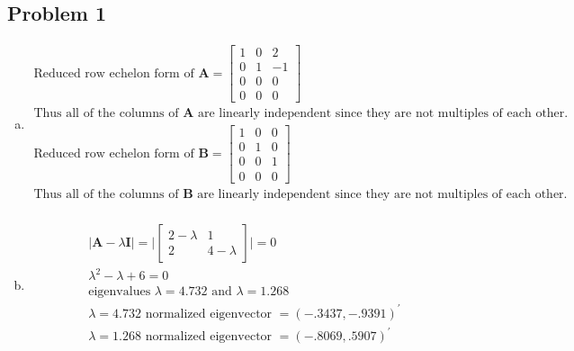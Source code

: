 \documentclass{article}
\begin{document}
\begin{flushleft}

	\section*{Problem 1}
\begin{enumerate}[(a)]
	\item 
\begin{multline*}
\text{Reduced row echelon form of } \boldsymbol{A}=\begin{bmatrix}
1&0&2\\
0&1&-1\\
0&0&0\\
0&0&0
\end{bmatrix}\\
\text{Thus  all of the columns of } \boldsymbol{A} \text{ are linearly independent since they are not multiples of each other.}\\
\text{Reduced row echelon form of } \boldsymbol{B}=\begin{bmatrix}
1&0&0\\
0&1&0\\
0&0&1\\
0&0&0
\end{bmatrix}\\
\text{Thus  all of the columns of } \boldsymbol{B} \text{ are linearly independent since they are not multiples of each other.}\\
\end{multline*}
	\item 
\begin{multline*}
|\boldsymbol{A}-\lambda\boldsymbol{I}|=\bigg|\begin{bmatrix}
2-\lambda & 1\\
2 & 4-\lambda
\end{bmatrix}\bigg|=0\\
\lambda^2-\lambda+6=0\\
\text{eigenvalues } \lambda = 4.732 \text{ and } \lambda = 1.268\\
\lambda = 4.732 \text{ normalized eigenvector }=(-.3437,-.9391)^{'}\\
\lambda = 1.268 \text{ normalized eigenvector }=(-.8069,.5907)^{'}\\
\end{multline*}

\end{enumerate}


\end{flushleft}
\end{document}
